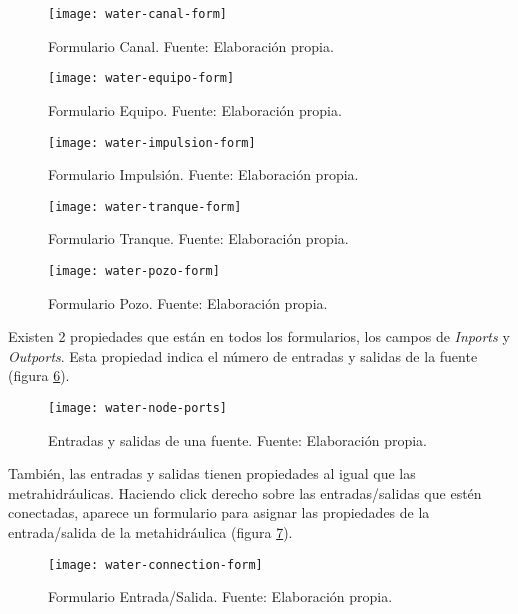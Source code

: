 \begin{figure}[H]
	\centering
	\texttt{[image: water-canal-form]}
	\caption{\label{fig:water-canal-form} Formulario Canal. Fuente: Elaboración propia.}
\end{figure}

\begin{figure}[H]
	\centering
	\texttt{[image: water-equipo-form]}
	\caption{\label{fig:water-Equipo-form} Formulario Equipo. Fuente: Elaboración propia.}
\end{figure}

\begin{figure}[H]
	\centering
	\texttt{[image: water-impulsion-form]}
	\caption{\label{fig:water-impulsion-form} Formulario Impulsión. Fuente: Elaboración propia.}
\end{figure}

\begin{figure}[H]
	\centering
	\texttt{[image: water-tranque-form]}
	\caption{\label{fig:water-tranque-form} Formulario Tranque. Fuente: Elaboración propia.}
\end{figure}

\begin{figure}[H]
	\centering
	\texttt{[image: water-pozo-form]}
	\caption{\label{fig:water-pozo-form} Formulario Pozo. Fuente: Elaboración propia.}
\end{figure}

Existen 2 propiedades que están en todos los formularios, los campos de \textit{Inports} y \textit{Outports}. Esta propiedad indica el número de entradas y salidas de la fuente (figura \ref{fig:water-node-ports}).

\begin{figure}[H]
	\centering
	\texttt{[image: water-node-ports]}
	\caption{\label{fig:water-node-ports} Entradas y salidas de una fuente. Fuente: Elaboración propia.}
\end{figure}

También, las entradas y salidas tienen propiedades al igual que las metrahidráulicas. Haciendo click derecho sobre las entradas/salidas que estén conectadas, aparece un formulario para asignar las propiedades de la entrada/salida de la metahidráulica (figura \ref{fig:water-conexion-form}).

\begin{figure}[H]
	\centering
	\texttt{[image: water-connection-form]}
	\caption{\label{fig:water-conexion-form} Formulario Entrada/Salida. Fuente: Elaboración propia.}
\end{figure}

